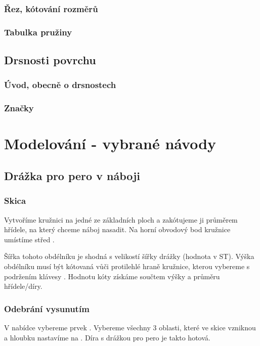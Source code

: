 \subsection{Řez, kótování rozměrů}

\subsection{Tabulka pružiny}

\section{Drsnosti povrchu}

\subsection{Úvod, obecně o drsnostech}

\subsection{Značky}

\newpage

\chapter{Modelování - vybrané návody}

\section{Drážka pro pero v náboji}

\subsection*{Skica}
Vytvoříme kružnici na jedné ze základních ploch a zakótujeme ji průměrem hřídele, na který chceme náboj nasadit.
Na horní obvodový bod kružnice umístíme střed .

Šířka tohoto obdélníku je shodná s velikostí šířky drážky (hodnota  v ST).
Výška obdélníku musí být kótovaná vůči protilehlé hraně kružnice, kterou vybereme s podržením klávesy .
Hodnotu kóty získáme součtem výšky  a průměru hřídele/díry.

\subsection*{Odebrání vysunutím}
V nabídce  vybereme prvek .
Vybereme všechny 3 oblasti, které ve skice vzniknou a hloubku nastavíme na .
Díra s drážkou pro pero je takto hotová.

